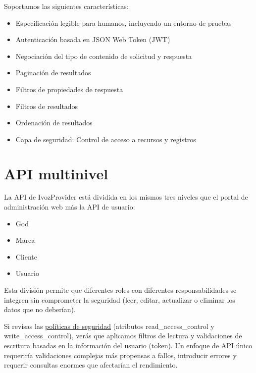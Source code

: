 \documentclass[letterpaper,10pt,spanish]{sphinxmanual}
\begin{document}
Soportamos las siguientes características:
\begin{itemize}
\item {} 
Especificación legible para humanos, incluyendo un entorno de pruebas

\item {} 
Autenticación basada en JSON Web Token (JWT)

\item {} 
Negociación del tipo de contenido de solicitud y respuesta

\item {} 
Paginación de resultados

\item {} 
Filtros de propiedades de respuesta

\item {} 
Filtros de resultados

\item {} 
Ordenación de resultados

\item {} 
Capa de seguridad: Control de acceso a recursos y registros

\end{itemize}


\chapter{API multinivel}
\label{api_rest/multilevel::doc}\label{api_rest/multilevel:multi-level-api}
La API de IvozProvider está dividida en los mismos tres niveles que el portal de administración web más la API de usuario:
\begin{itemize}
\item {} 
God

\item {} 
Marca

\item {} 
Cliente

\item {} 
Usuario

\end{itemize}

Esta división permite que diferentes roles con diferentes responsabilidades se integren sin comprometer la seguridad (leer, editar, actualizar o eliminar los datos que no deberían).

Si revisas las \href{https://github.com/irontec/ivozprovider/blob/main/web/rest/brand/config/api/raw/provider.yml}{políticas de seguridad} (atributos read\_access\_control y write\_access\_control), verás que aplicamos filtros de lectura y validaciones de escritura basadas en la información del usuario (token). Un enfoque de API único requeriría validaciones complejas más propensas a fallos, introducir errores y requerir consultas enormes que afectarían el rendimiento.
\end{document}
